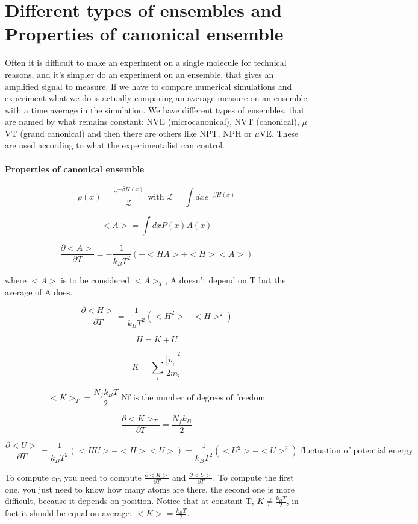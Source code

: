 \documentclass[a4paper, italian, openany]{book}
\begin{document}
\section{Different types of ensembles and Properties of canonical ensemble}

Often it is difficult to make an experiment on a single molecule for technical reasons, and it's simpler do an experiment on an ensemble, that gives an amplified signal to measure. If we have to compare numerical simulations and experiment what we do is actually comparing an average measure on an ensemble with a time average in the simulation.\newline
We have different types of ensembles, that are named by what remains constant: NVE (microcanonical), NVT (canonical), $\mu$VT (grand canonical) and then there are others like NPT, NPH or $\mu$VE. These are used according to what the experimentalist can control.

\paragraph{Properties of canonical ensemble}

$$\rho (x) = \frac{e^{-\beta H(x)}}{\mathcal{Z}} \mbox{ with } \mathcal{Z} = \int dx e^{-\beta H(x)}$$

$$<A> = \int dx P(x) A(x)$$

$$\frac{\partial <A>}{\partial T} = -\frac{1}{k_B T^2} (-<HA> + <H><A>)$$

where $<A>$ is to be considered $<A>_T$, A doesn't depend on T but the average of A does.

$$\frac{\partial <H>}{\partial T} = \frac{1}{k_B T^2} (<H^2> - <H>^2)$$

$$H = K + U$$

$$K = \sum_i \frac{|p_i|^2}{2 m_i}$$

$$<K>_T = \frac{N_f k_B T}{2} \mbox{ Nf is the number of degrees of freedom}$$

$$\frac{\partial <K>_T}{\partial T} = \frac{N_f k_B}{2}$$

$$\frac{\partial <U>}{\partial T} = \frac{1}{k_B T^2} (<HU> - <H><U>) = \frac{1}{k_B T^2}(<U^2> -<U>^2) \mbox{ fluctuation of potential energy}$$

To compute  $c_V$, you need to compute $\frac{\partial <K>}{\partial T}$ and $\frac{\partial <U>}{\partial T}$. To compute the first one, you just need to know how many atoms are there, the second one is more difficult, because it depends on position.\newline
Notice that at constant T, $K \ne \frac{k_B T}{2}$, in fact it should be equal on average: $<K> = \frac{k_B T}{2}$.
\end{document}
